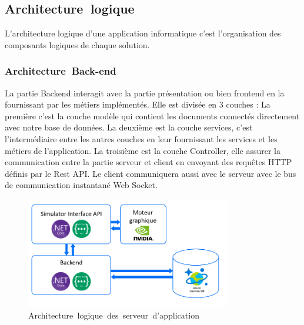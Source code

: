 \subsection{Architecture\textcolor{white}{J}logique}
L’architecture logique d’une application informatique c’est l’organisation des composants logiques de chaque solution. 

\subsubsection{Architecture\textcolor{white}{J}Back-end}
La partie Backend interagit avec la partie présentation ou bien frontend en la fournissant par les métiers implémentés. Elle est divisée en 3 couches : La première c’est la couche modèle qui contient les documents connectés directement avec notre base de données. La deuxième est la couche services, c’est l’intermédiaire entre les autres couches en leur fournissant les services et les métiers de l’application. La troisième est la couche Controller, elle assurer la communication entre la partie serveur et client en envoyant des requêtes HTTP définis par le Rest API. Le client communiquera aussi avec le serveur avec le bus de communication instantané Web Socket.

\begin{figure}[!ht]
\centering
\includegraphics[width=0.8\textwidth,angle=00]{chapitres/chapitre2/figures/ArchLog-B.png}
\caption{Architecture\textcolor{white}{J}logique\textcolor{white}{J}des\textcolor{white}{J}serveur\textcolor{white}{J}d'application}
\label{fig:archb}
\end{figure}

\newpage

